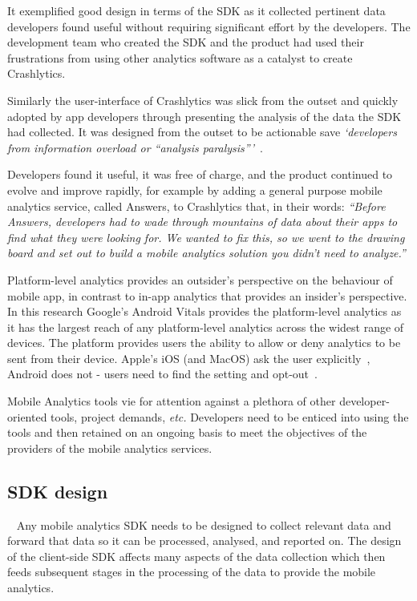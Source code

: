 It exemplified good design in terms of the SDK as it collected pertinent data developers found useful without requiring significant effort by the developers. The development team who created the SDK and the product had used their frustrations from using other analytics software as a catalyst to create Crashlytics. 

Similarly the user-interface of Crashlytics was slick from the outset and quickly adopted by app developers through presenting the analysis of the data the SDK had collected. It was designed from the outset to be actionable save \emph{`developers from information overload or ``analysis paralysis'''}~.

Developers found it useful, it was free of charge, and the product continued to evolve and improve rapidly, for example by adding a general purpose mobile analytics service, called Answers, to Crashlytics that, in their words: \emph{``Before Answers, developers had to wade through mountains of data about their apps to find what they were looking for. We wanted to fix this, so we went to the drawing board and set out to build a mobile analytics solution you didn’t need to analyze.''}~ 

Platform-level analytics provides an outsider's perspective on the behaviour of mobile app, in contrast to in-app analytics that provides an insider's perspective. In this research Google's Android Vitals provides the platform-level analytics as it has the largest reach of any platform-level analytics across the widest range of devices. The platform provides users the ability to allow or deny analytics to be sent from their device. Apple's iOS (and MacOS) ask the user explicitly~, Android does not - users need to find the setting and opt-out~. %

Mobile Analytics tools vie for attention against a plethora of other developer-oriented tools, project demands, \emph{etc.} Developers need to be enticed into using the tools and then retained on an ongoing basis to meet the objectives of the providers of the mobile analytics services.

\subsection{SDK design}~\label{section-sdk-design}
Any mobile analytics SDK needs to be designed to collect relevant data and forward that data so it can be processed, analysed, and reported on. The design of the client-side SDK affects many aspects of the data collection which then feeds subsequent stages in the processing of the data to provide the mobile analytics.

